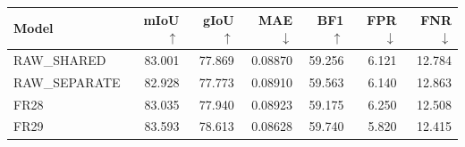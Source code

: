 \par\medskip\noindent\begin{minipage}{\linewidth}
\centering\small\setlength{\tabcolsep}{3pt}
\label{tab:last}
\begin{tabular}{lrrrrrr}
\toprule
Model & mIoU$\uparrow$ & gIoU$\uparrow$ & MAE$\downarrow$ & BF1$\uparrow$ & FPR$\downarrow$ & FNR$\downarrow$\\\midrule

RAW\_SHARED & 83.001 & 77.869 & 0.08870 & 59.256 & 6.121 & 12.784\\
RAW\_SEPARATE & 82.928 & 77.773 & 0.08910 & 59.563 & 6.140 & 12.863\\
FR28 & 83.035 & 77.940 & 0.08923 & 59.175 & 6.250 & 12.508\\
FR29 & 83.593 & 78.613 & 0.08628 & 59.740 & 5.820 & 12.415\\
\bottomrule
\end{tabular}
\end{minipage}\par\medskip
